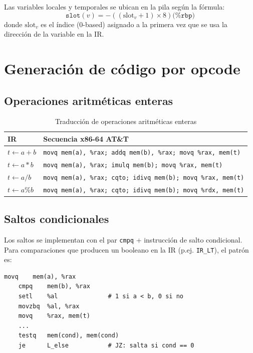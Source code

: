 Las variables locales y temporales se ubican en la pila según la fórmula:
\[
  \texttt{slot}(v) = -((\text{slot}_v + 1) \times 8)\texttt{(\%rbp)}
\]
donde $\text{slot}_v$ es el índice (0-based) asignado a la primera vez
que se usa la dirección de la variable en la IR.

\section{Generación de código por opcode}

\subsection{Operaciones aritméticas enteras}

\begin{table}[H]
  \centering
  \caption{Traducción de operaciones aritméticas enteras}
  \label{tab:arith}
  \begin{tabular}{lp{8cm}}
    \toprule
    \textbf{IR}     & \textbf{Secuencia x86-64 AT\&T} \\
    \midrule
    $t \leftarrow a + b$ &
      \texttt{movq mem(a), \%rax; addq mem(b), \%rax; movq \%rax, mem(t)} \\
    $t \leftarrow a * b$ &
      \texttt{movq mem(a), \%rax; imulq mem(b); movq \%rax, mem(t)} \\
    $t \leftarrow a / b$ &
      \texttt{movq mem(a), \%rax; cqto; idivq mem(b); movq \%rax, mem(t)} \\
    $t \leftarrow a \% b$ &
      \texttt{movq mem(a), \%rax; cqto; idivq mem(b); movq \%rdx, mem(t)} \\
    \bottomrule
  \end{tabular}
\end{table}

\subsection{Saltos condicionales}

Los saltos se implementan con el par \texttt{cmpq} + instrucción de salto
condicional. Para comparaciones que producen un booleano en la IR (p.ej.
\texttt{IR\_LT}), el patrón es:

\begin{lstlisting}[style=asm, caption={Comparación IR\_LT y salto condicional}]
    movq    mem(a), %rax
    cmpq    mem(b), %rax
    setl    %al              # 1 si a < b, 0 si no
    movzbq  %al, %rax
    movq    %rax, mem(t)
    ...
    testq   mem(cond), mem(cond)
    je      L_else           # JZ: salta si cond == 0
\end{lstlisting}

